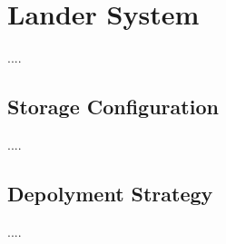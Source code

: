 \chapter{Lander System}
\label{chap:lander}
....

\section{Storage Configuration}
\label{sec:storage}
....

\section{Depolyment Strategy}
\label{sec:deployment}
....